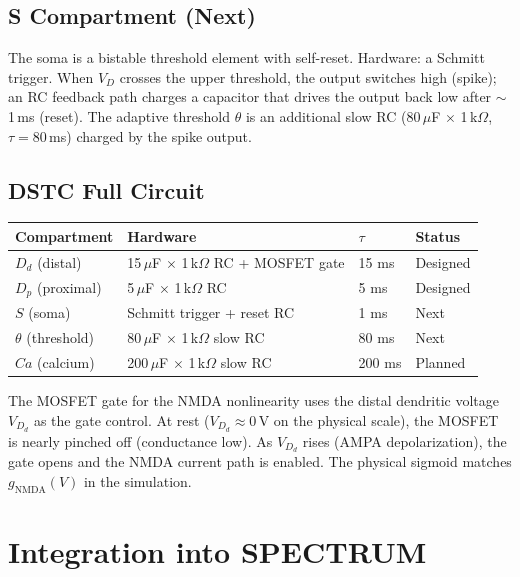 \documentclass[12pt]{article}
\begin{document}
\subsection{S Compartment (Next)}

The soma is a bistable threshold element with self-reset. Hardware: a Schmitt trigger. When $V_D$ crosses the upper threshold, the output switches high (spike); an RC feedback path charges a capacitor that drives the output back low after $\sim$1\,ms (reset). The adaptive threshold $\theta$ is an additional slow RC ($80\,\mu$F $\times$ 1\,k$\Omega$, $\tau = 80$\,ms) charged by the spike output.

\subsection{DSTC Full Circuit}

\begin{center}
\small
\begin{tabular}{llll}
\toprule
\textbf{Compartment} & \textbf{Hardware} & \textbf{$\tau$} & \textbf{Status} \\
\midrule
$D_d$ (distal)   & 15\,$\mu$F $\times$ 1\,k$\Omega$ RC + MOSFET gate & 15 ms & Designed \\
$D_p$ (proximal) &  5\,$\mu$F $\times$ 1\,k$\Omega$ RC                &  5 ms & Designed \\
$S$ (soma)       & Schmitt trigger + reset RC                          &  1 ms & Next \\
$\theta$ (threshold) & 80\,$\mu$F $\times$ 1\,k$\Omega$ slow RC       & 80 ms & Next \\
$Ca$ (calcium)   & 200\,$\mu$F $\times$ 1\,k$\Omega$ slow RC          & 200 ms & Planned \\
\bottomrule
\end{tabular}
\end{center}

\noindent The MOSFET gate for the NMDA nonlinearity uses the distal dendritic voltage $V_{D_d}$ as the gate control. At rest ($V_{D_d} \approx 0$\,V on the physical scale), the MOSFET is nearly pinched off (conductance low). As $V_{D_d}$ rises (AMPA depolarization), the gate opens and the NMDA current path is enabled. The physical sigmoid matches $g_{\text{NMDA}}(V)$ in the simulation.

\section{Integration into SPECTRUM}
\label{sec:integration}
\end{document}
